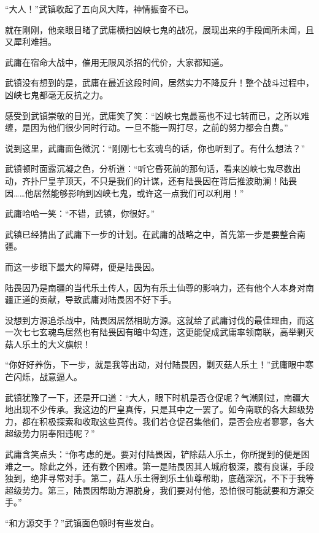 
\begin{this_body}

“大人！”武镇收起了五向风大阵，神情振奋不已。

就在刚刚，他亲眼目睹了武庸横扫凶峡七鬼的战况，展现出来的手段闻所未闻，且又犀利难挡。

武庸在宿命大战中，催用无限风杀招的代价，大家都知道。

武镇没有想到的是，武庸在最近这段时间，居然实力不降反升！整个战斗过程中，凶峡七鬼都毫无反抗之力。

感受到武镇崇敬的目光，武庸笑了笑：“凶峡七鬼最高也不过七转而已，之所以难缠，是因为他们很少同时行动。一旦不能一网打尽，之前的努力都会白费。”

说到这里，武庸面色微沉：“刚刚七七玄魂鸟的话，你也听到了。有什么想法？”

武镇顿时面露沉凝之色，分析道：“听它昏死前的那句话，看来凶峡七鬼尽数出动，齐扑尸皇芋顶天，不只是我们的计谋，还有陆畏因在背后推波助澜！陆畏因……他居然能够影响到凶峡七鬼，或许这一点我们可以利用！”

武庸哈哈一笑：“不错，武镇，你很好。”

武镇已经猜出了武庸下一步的计划。在武庸的战略之中，首先第一步是要整合南疆。

而这一步眼下最大的障碍，便是陆畏因。

陆畏因乃是南疆的当代乐土传人，因为有乐土仙尊的影响力，还有他个人本身对南疆正道的贡献，导致武庸对陆畏因不好下手。

没想到方源追杀战中，陆畏因居然相助方源。这就给了武庸讨伐的最佳理由，而这一次七七玄魂鸟居然也有陆畏因有暗中勾连，这更能促成武庸率领南联，高举剿灭菇人乐土的大义旗帜！

“你好好养伤，下一步，就是我等出动，对付陆畏因，剿灭菇人乐土！”武庸眼中寒芒闪烁，战意逼人。

武镇犹豫了一下，还是开口道：“大人，眼下时机是否仓促呢？气潮刚过，南疆大地出现不少传承。我这边的尸皇真传，只是其中之一罢了。如今南联的各大超级势力，都在积极探索和收取这些真传。我们若仓促召集他们，是否会应者寥寥，各大超级势力阴奉阳违呢？”

武庸含笑点头：“你考虑的是。要对付陆畏因，铲除菇人乐土，你所提到的便是困难之一。除此之外，还有数个困难。第一是陆畏因其人城府极深，腹有良谋，手段独到，绝非寻常对手。第二，菇人乐土得到乐土仙尊帮助，底蕴深沉，不下于我等超级势力。第三，陆畏因帮助方源脱身，我们要对付他，恐怕很可能就要和方源交手。”

“和方源交手？”武镇面色顿时有些发白。


\end{this_body}
